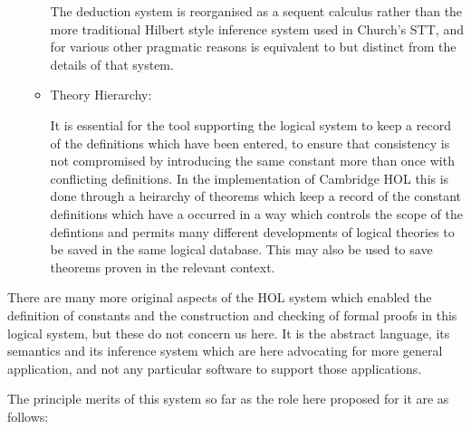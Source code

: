 \documentclass[10pt,titlepage]{book}
\begin{document}
\begin{itemize}
\begin{itemize}
    The deduction system is reorganised as a sequent calculus rather than the more traditional Hilbert style inference system used in Church's STT, and for various other pragmatic reasons is equivalent to but distinct from the details of that system.

  \item Theory Hierarchy:

    It is essential for the tool supporting the logical system to keep a record of the definitions which have been entered, to ensure that consistency is not compromised by introducing the same constant more than once with conflicting definitions.
    In the implementation of Cambridge HOL this is done through a heirarchy of theorems which keep a record of the constant definitions which have a occurred in a way which controls the scope of the defintions and permits many different developments of logical theories to be saved in the same logical database.
    This may also be used to save theorems proven in the relevant context.
  \end{itemize}
\end{itemize}

There are many more original aspects of the HOL system which enabled the definition of constants and the construction and checking of formal proofs in this logical system, but these do not concern us here.
It is the abstract language, its semantics and its inference system which are here advocating for more general application, and not any particular software to support those applications.

The principle merits of this system so far as the role here proposed for it are as follows:
\end{document}
